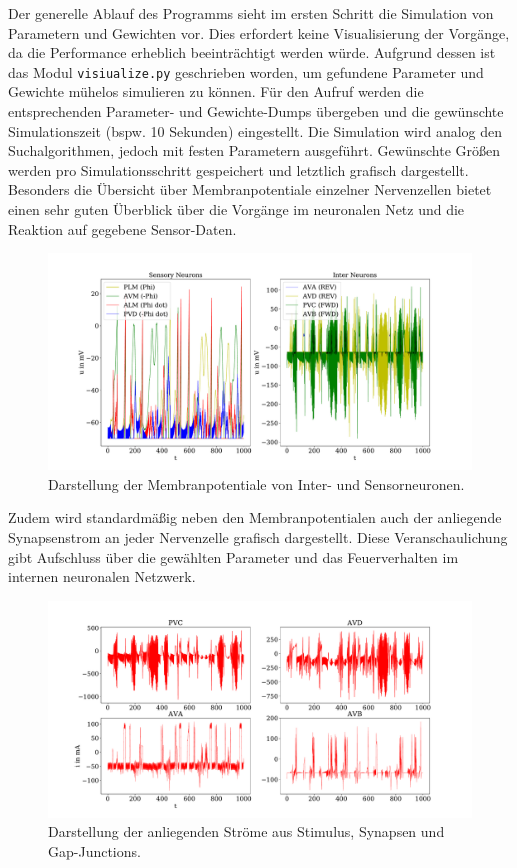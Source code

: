 	Der generelle Ablauf des Programms sieht im ersten Schritt die Simulation von Parametern und Gewichten vor. Dies erfordert keine Visualisierung der Vorgänge, da die Performance erheblich beeinträchtigt werden würde. Aufgrund dessen ist das Modul \texttt{visiualize.py} geschrieben worden, um gefundene Parameter und Gewichte mühelos simulieren zu können. Für den Aufruf werden die entsprechenden Parameter- und Gewichte-Dumps übergeben und die gewünschte Simulationszeit (bspw. 10 Sekunden) eingestellt. Die Simulation wird analog den Suchalgorithmen, jedoch mit festen Parametern ausgeführt. Gewünschte Größen werden pro Simulationsschritt gespeichert und letztlich grafisch dargestellt. Besonders die Übersicht über Membranpotentiale einzelner Nervenzellen bietet einen sehr guten Überblick über die Vorgänge im neuronalen Netz und die Reaktion auf gegebene Sensor-Daten.
	\begin{figure}[H] %
		\centering
		\includegraphics[width=15cm]{figures/chap_implement/plot_membranpot_1.pdf}
		\caption{Darstellung der Membranpotentiale von Inter- und Sensorneuronen.}
		\label{fig:plot_membr}
	\end{figure}
	Zudem wird standardmäßig neben den Membranpotentialen auch der anliegende Synapsenstrom an jeder Nervenzelle grafisch dargestellt. Diese Veranschaulichung gibt Aufschluss über die gewählten Parameter und das Feuerverhalten im internen neuronalen Netzwerk.
	\begin{figure}[H] %
		\centering
		\includegraphics[width=15cm]{figures/chap_implement/plot_synstrom_1.pdf}
		\caption{Darstellung der anliegenden Ströme aus Stimulus, Synapsen und Gap-Junctions.}
		\label{fig:plot_synstrom}
	\end{figure}
